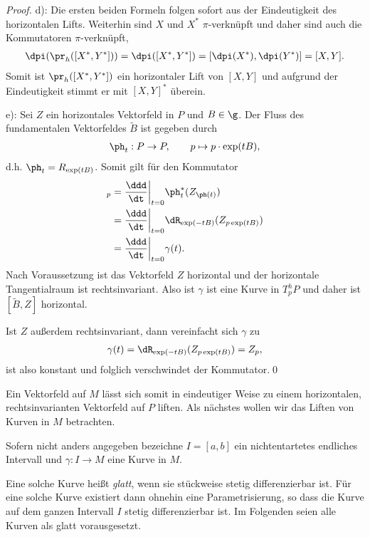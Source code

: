 \documentclass[%
	paper=a5,%
	fleqn,%
	DIV=18,%
	BCOR=0mm,
	fontsize=11pt,
	titlepage=false,%
	bibliography=totoc,
	DIV=18,%
	twoside=true,
	pdftitle=Riemannsche Geometrie,
	pdfauthor=Uwe Semmelmann,
	numbers=noendperiod]%
	{scrbook}
\begin{document}
\begin{proof}
d): Die ersten beiden Formeln folgen sofort aus der Eindeutigkeit des
horizontalen Lifts. Weiterhin sind $X$ und $X^*$ $\pi$-verknüpft und daher sind
auch die Kommutatoren $\pi$-verknüpft,
\begin{align*}
\dpi(\pr_h([X^*,Y^*])) = 
\dpi([X^*,Y^*]) = 
[\dpi(X^*),\dpi(Y^*)] = [X,Y].
\end{align*}
Somit ist $\pr_h([X^*,Y^*])$ ein horizontaler Lift von $[X,Y]$ und aufgrund der
Eindeutigkeit stimmt er mit $[X,Y]^*$ überein.

e): Sei $Z$ ein horizontales Vektorfeld in $P$ und $B\in\g$. Der Fluss des
fundamentalen Vektorfeldes $\tilde{B}$ ist gegeben durch
\begin{align*}
\ph_t : P\to P,\qquad p\mapsto p\cdot \exp(tB), 
\end{align*}
d.h. $\ph_t = R_{\exp(tB)}$. Somit gilt für den Kommutator
\begin{align*}
[\tilde{B},Z]_p  &= \frac{\ddd}{\dt}\bigg|_{t=0} \ph_t^*(Z_{\ph(t)})\\
&= \frac{\ddd}{\dt}\bigg|_{t=0} \dR_{\exp(-tB)}(Z_{p\exp(tB)})\\
&= \frac{\ddd}{\dt}\bigg|_{t=0} \gamma(t).
\end{align*}
Nach Voraussetzung ist das Vektorfeld $Z$ horizontal und der horizontale Tangentialraum ist
rechtsinvariant. Also ist $\gamma$ ist eine Kurve in $T^h_pP$ und daher ist
$[\tilde{B},Z]$ horizontal.

Ist $Z$ außerdem rechts\-invariant, dann vereinfacht sich $\gamma$ zu
\begin{align*}
\gamma(t) = \dR_{\exp(-tB)}(Z_{p\exp(tB)}) = Z_p,
\end{align*}
ist also konstant und folglich verschwindet der Kommutator.\qed
\end{proof}

Ein Vektorfeld auf $M$ lässt sich somit in eindeutiger Weise zu einem
horizontalen, rechtsinvarianten Vektorfeld auf $P$ liften. Als nächstes wollen
wir das Liften von Kurven in $M$ betrachten. 


\begin{rem}
Sofern nicht anders angegeben bezeichne $I=[a,b]$ ein nichtentartetes endliches
Intervall und $\gamma\colon I\to M$ eine Kurve in $M$.

Eine solche Kurve heißt \textit{glatt}, wenn sie stückweise stetig
differenzierbar ist. Für eine solche Kurve existiert dann ohnehin eine
Parametrisierung, so dass die Kurve auf dem ganzen Intervall $I$ stetig
differenzierbar ist. Im Folgenden seien alle Kurven als glatt vorausgesetzt.
\map
\end{rem}
\end{document}
